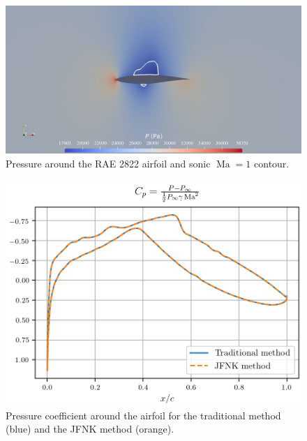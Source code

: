         \begin{figure}
          \centering
          \includegraphics[width=\textwidth]{figures/rae_field.png}
          \caption{Pressure around the RAE 2822 airfoil and sonic $\operatorname{Ma} = 1$ contour.}
          \label{fig:rae_field}
        \end{figure}

        \begin{figure}
          \centering
          \includegraphics{figures/rae_cp.png}
          \caption{Pressure coefficient around the airfoil for the traditional method (blue) and the JFNK method (orange).}
          \label{fig:rae_cp}
        \end{figure}

